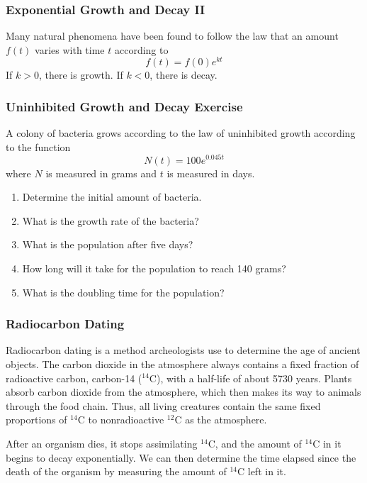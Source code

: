 \documentclass[xcolor=dvipsnames]{beamer}
\begin{document}
\begin{frame}
  \frametitle{Exponential Growth and Decay II}
Many natural phenomena have been found to follow the law that an
amount $f(t)$ varies with time $t$ according to
  \begin{equation}
    \label{eq:lauwutho}
    f(t)=f(0)e^{kt}
  \end{equation}
If $k>0$, there is growth. If $k<0$, there is decay.
\end{frame}

\begin{frame}
  \frametitle{Uninhibited Growth and Decay Exercise}
A colony of bacteria grows according to the law of uninhibited growth
according to the function
\begin{equation}
  \label{eq:chiowezo}
  N(t)=100e^{0.045t}
\end{equation}
where $N$ is measured in grams and $t$ is measured in days.
  \begin{enumerate}
  \item Determine the initial amount of bacteria.
  \item What is the growth rate of the bacteria?
  \item What is the population after five days?
  \item How long will it take for the population to reach 140
    grams?
  \item What is the doubling time for the population?
  \end{enumerate}
\end{frame}

\begin{frame}
  \frametitle{Radiocarbon Dating}
Radiocarbon dating is a method archeologists use to determine the age
of ancient objects. The carbon dioxide in the atmosphere always
contains a fixed fraction of radioactive carbon, carbon-14 ($^{14}$C),
with a half-life of about 5730 years. Plants absorb carbon dioxide
from the atmosphere, which then makes its way to animals through the
food chain. Thus, all living creatures contain the same fixed
proportions of $^{14}$C to nonradioactive $^{12}$C as the atmosphere.

\medskip

After an organism dies, it stops assimilating $^{14}$C, and the amount
of $^{14}$C in it begins to decay exponentially. We can then determine
the time elapsed since the death of the organism by measuring the
amount of $^{14}$C left in it.
\end{frame}
\end{document}
